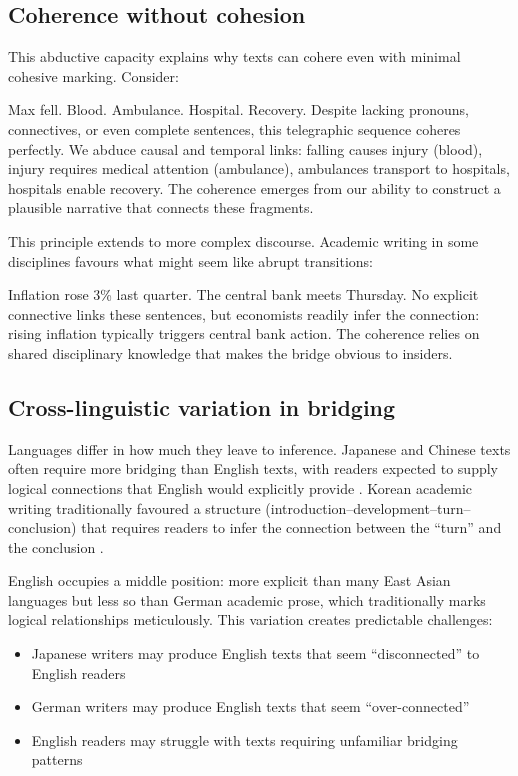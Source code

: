 \subsection{Coherence without cohesion}

This abductive capacity explains why texts can cohere even with minimal cohesive marking. Consider:

\ea
   Max fell. Blood. Ambulance. Hospital. Recovery.
\z
Despite lacking pronouns, connectives, or even complete sentences, this telegraphic sequence coheres perfectly. We abduce causal and temporal links: falling causes injury (blood), injury requires medical attention (ambulance), ambulances transport to hospitals, hospitals enable recovery. The coherence emerges from our ability to construct a plausible narrative that connects these fragments.

This principle extends to more complex discourse. Academic writing in some disciplines favours what might seem like abrupt transitions:

\ea
   Inflation rose 3\% last quarter. The central bank meets Thursday.
\z
No explicit connective links these sentences, but economists readily infer the connection: rising inflation typically triggers central bank action. The coherence relies on shared disciplinary knowledge that makes the bridge obvious to insiders.

\subsection{Cross-linguistic variation in bridging}

Languages differ in how much they leave to inference. Japanese and Chinese texts often require more bridging than English texts, with readers expected to supply logical connections that English would explicitly provide \citep{Hinds1987}. Korean academic writing traditionally favoured a  structure (intro\-duction--development--turn--conclusion) that requires readers to infer the connection between the \enquote{turn} and the conclusion \citep{Kaplan1966}.

English occupies a middle position: more explicit than many East Asian languages but less so than German academic prose, which traditionally marks logical relationships meticulously. This variation creates predictable challenges:

\begin{itemize}[noitemsep]
   \item Japanese writers may produce English texts that seem \enquote{disconnected} to English readers
   \item German writers may produce English texts that seem \enquote{over-connected}
   \item English readers may struggle with texts requiring unfamiliar bridging patterns
\end{itemize}



